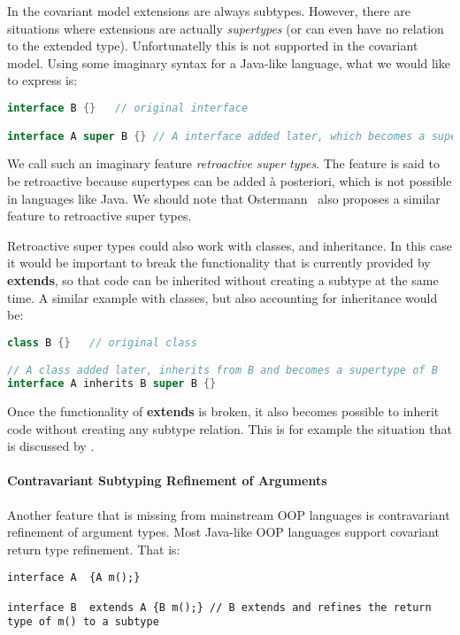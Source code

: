 In the covariant model extensions are always subtypes. However, 
there are situations where extensions are actually
\emph{supertypes} (or can even have no relation to the extended type). Unfortunatelly this is not supported in the
covariant model. Using some imaginary syntax for a Java-like language, 
what we would like to express is:

\begin{lstlisting}[language=java]
interface B {}   // original interface

interface A super B {} // A interface added later, which becomes a supertype of B
\end{lstlisting}

\noindent We call such an imaginary feature \emph{retroactive super
  types}. The feature is said to be retroactive because supertypes can
be added \`a posteriori, which is not possible in languages like Java.
We should note that Ostermann~\cite{}
also proposes a similar feature to retroactive super types.

Retroactive super types could also work with classes, and
inheritance. In this case it would be important to break the
functionality that is currently provided by {\bf extends}, so that 
code can be inherited without creating a subtype at the same time. 
A similar example with classes, but also accounting for inheritance 
would be:

\begin{lstlisting}[language=java]
class B {}   // original class

// A class added later, inherits from B and becomes a supertype of B
interface A inherits B super B {} 
\end{lstlisting}

\noindent Once the functionality of {\bf extends} is broken, it also
becomes possible to inherit code without creating any subtype
relation. This is for example the situation that is discussed by \citet{cook1989inheritance}.

\paragraph{Contravariant Subtyping Refinement of Arguments}
Another feature that is missing from mainstream OOP languages is 
contravariant refinement of argument types. Most Java-like OOP languages support covariant return type 
refinement. That is:

\begin{lstlisting}
interface A  {A m();} 

interface B  extends A {B m();} // B extends and refines the return type of m() to a subtype
\end{lstlisting}

